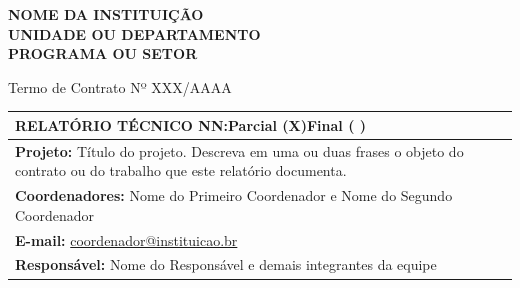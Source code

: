 \begin{center}
  \textbf{NOME DA INSTITUIÇÃO}\\
  \textbf{UNIDADE OU DEPARTAMENTO}\\
  \textbf{PROGRAMA OU SETOR}
\end{center}

\vspace{0.8em}
\begin{center}
  Termo de Contrato Nº XXX/AAAA
\end{center}
\vspace{0.5em}

\begin{center}
\begin{tabularx}{0.85\textwidth}{|>{\RaggedRight\arraybackslash}X|}
  \hline
  \begin{minipage}[t]{\linewidth}\centering\textbf{RELATÓRIO TÉCNICO NN:}\hspace{1.5em}Parcial (X)\hspace{1.5em}Final ( )\end{minipage}\\
  \hline
  \textbf{Projeto:} Título do projeto. Descreva em uma ou duas frases o objeto do contrato ou do trabalho que este relatório documenta.\\
  \hline
  \textbf{Coordenadores:} Nome do Primeiro Coordenador e Nome do Segundo Coordenador\\
  \hline
  \textbf{E-mail:} \href{mailto:coordenador@instituicao.br}{coordenador@instituicao.br}\\
  \hline
  \textbf{Responsável:} Nome do Responsável e demais integrantes da equipe\\
  \hline
\end{tabularx}
\end{center}
